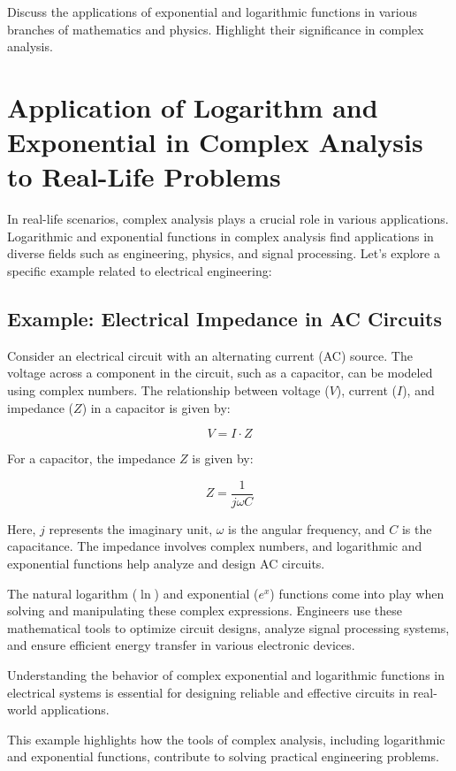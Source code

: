 \documentclass[12pt]{article}
\begin{document}
Discuss the applications of exponential and logarithmic functions in various branches of mathematics and physics. Highlight their significance in complex analysis.

\section{Application of Logarithm and Exponential in Complex Analysis to Real-Life Problems}

In real-life scenarios, complex analysis plays a crucial role in various applications. Logarithmic and exponential functions in complex analysis find applications in diverse fields such as engineering, physics, and signal processing. Let's explore a specific example related to electrical engineering:

\subsection{Example: Electrical Impedance in AC Circuits}

Consider an electrical circuit with an alternating current (AC) source. The voltage across a component in the circuit, such as a capacitor, can be modeled using complex numbers. The relationship between voltage (\(V\)), current (\(I\)), and impedance (\(Z\)) in a capacitor is given by:

\[ V = I \cdot Z \]

For a capacitor, the impedance \(Z\) is given by:

\[ Z = \frac{1}{j\omega C} \]

Here, \(j\) represents the imaginary unit, \(\omega\) is the angular frequency, and \(C\) is the capacitance. The impedance involves complex numbers, and logarithmic and exponential functions help analyze and design AC circuits.

The natural logarithm (\(\ln\)) and exponential (\(e^x\)) functions come into play when solving and manipulating these complex expressions. Engineers use these mathematical tools to optimize circuit designs, analyze signal processing systems, and ensure efficient energy transfer in various electronic devices.

Understanding the behavior of complex exponential and logarithmic functions in electrical systems is essential for designing reliable and effective circuits in real-world applications.

This example highlights how the tools of complex analysis, including logarithmic and exponential functions, contribute to solving practical engineering problems.
\end{document}
